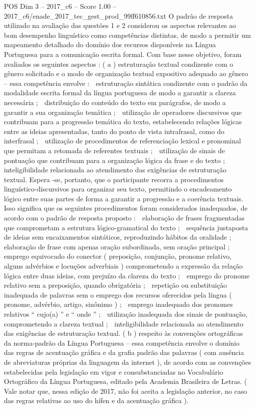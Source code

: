 \begin{textsample}{POS Dim 3 – 2017\_c6 – Score 1.00 – 2017\_c6/enade\_2017\_tec\_gest\_prod\_99ff610856.txt}
O padrão de resposta utilizado na avaliação das questões 1 e 2 considerou os aspectos relevantes ao bom desempenho linguístico como competências distintas, de modo a permitir um mapeamento detalhado do domínio dos recursos disponíveis na Língua Portuguesa para a comunicação escrita formal.
Com base nesse objetivo, foram avaliados os seguintes aspectos : ( a ) estruturação textual condizente com o gênero solicitado e o modo de organização textual expositivo adequado ao gênero – essa competência envolve :  estruturação sintática condizente com o padrão da modalidade escrita formal da língua portuguesa de modo a garantir a clareza necessária ;  distribuição do conteúdo do texto em parágrafos, de modo a garantir a sua organização temática ;  utilização de operadores discursivos que contribuam para a progressão temática do texto, estabelecendo relações lógicas entre as ideias apresentadas, tanto do ponto de vista intrafrasal, como do interfrasal ;  utilização de procedimentos de referenciação lexical e pronominal que permitam a retomada de referentes textuais ;  utilização de sinais de pontuação que contribuam para a organização lógica da frase e do texto ;  inteligibilidade relacionada ao atendimento das exigências de estruturação textual.
Espera -se, portanto, que o participante recorra a procedimentos linguístico-discursivos para organizar seu texto, permitindo o encadeamento lógico entre suas partes de forma a garantir a progressão e a coerência textuais.
Isso significa que os seguintes procedimentos foram considerados inadequados, de acordo com o padrão de resposta proposto :  elaboração de frases fragmentadas que comprometam a estrutura lógico-gramatical do texto ;  sequência justaposta de ideias sem encaixamentos sintáticos, reproduzindo hábitos da oralidade ;  elaboração de frase com apenas oração subordinada, sem oração principal ;  emprego equivocado do conector ( preposição, conjunção, pronome relativo, alguns advérbios e locuções adverbiais ) comprometendo a expressão da relação lógica entre duas ideias, com prejuízo da clareza do texto ;  emprego do pronome relativo sem a preposição, quando obrigatória ;  repetição ou substituição inadequada de palavras sem o emprego dos recursos oferecidos pela língua ( pronome, advérbio, artigo, sinônimo ) ;  emprego inadequado dos pronomes relativos “ cujo(a) ” e “ onde ” ;  utilização inadequada dos sinais de pontuação, comprometendo a clareza textual ;  inteligibilidade relacionada ao atendimento das exigências de estruturação textual. ( b ) respeito às convenções ortográficas da norma-padrão da Língua Portuguesa – essa competência envolve o domínio das regras de acentuação gráfica e da grafia padrão das palavras ( com ausência de abreviaturas próprias da linguagem da internet ), de acordo com as convenções estabelecidas pela legislação em vigor e consubstanciadas no Vocabulário Ortográfico da Língua Portuguesa, editado pela Academia Brasileira de Letras. ( Vale notar que, nessa edição de 2017, não foi aceita a legislação anterior, no caso das regras relativas ao uso do hífen e da acentuação gráfica ).

\end{textsample}
